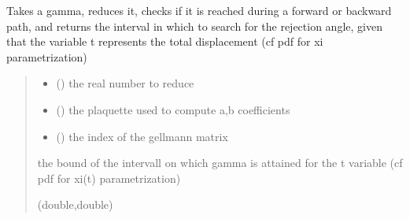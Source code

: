 \documentclass[letterpaper,10pt,english]{sphinxmanual}
\begin{document}
\begin{fulllineitems}
\label{\detokenize{analytical_reject:analytical_reject.intervalle}}
\pysigstartsignatures
\pysiglinewithargsret
{}
{\sphinxparamcomma {}\sphinxparamcomma {}}
{}
\pysigstopsignatures
\sphinxAtStartPar
Takes a gamma, reduces it, checks if it is reached during a forward or backward path, and returns the interval in which to search for the rejection angle, given that the variable t represents the total displacement (cf pdf for xi parametrization)
\begin{quote}\begin{description}
\begin{itemize}
\item {} 
\sphinxAtStartPar
{} () \textendash{} the real number to reduce

\item {} 
\sphinxAtStartPar
{} () \textendash{} the plaquette used to compute a,b coefficients

\item {} 
\sphinxAtStartPar
{} () \textendash{} the index of the gell\sphinxhyphen{}mann matrix

\end{itemize}

\sphinxAtStartPar
the bound of the intervall on which gamma is attained for the t variable (cf pdf for xi(t) parametrization)

\sphinxAtStartPar
(double,double)

\end{description}\end{quote}

\end{fulllineitems}

\end{document}
